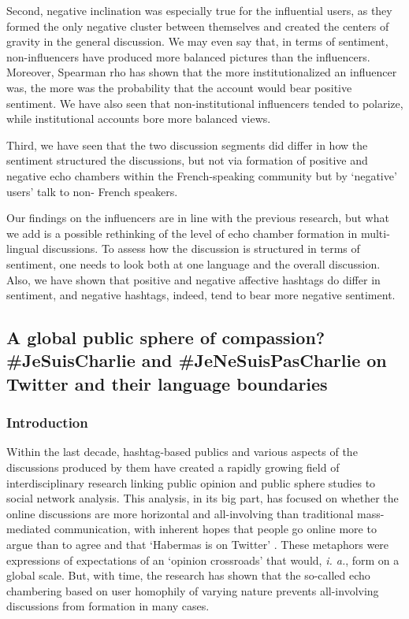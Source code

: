 Second, negative inclination was especially true for the influential users, as they formed the only negative cluster between themselves and created the centers of gravity in the general discussion. We may even say that, in terms of sentiment, non-influencers have produced more balanced pictures than the influencers. Moreover, Spearman rho has shown that the more institutionalized an influencer was, the more was the probability that the account would bear positive sentiment. We have also seen that non-institutional influencers tended to polarize, while institutional accounts bore more balanced views.

Third, we have seen that the two discussion segments did differ in how the sentiment structured the discussions, but not via formation of positive and negative echo chambers within the French-speaking community but by ‘negative’ users’ talk to non-
French speakers.

Our findings on the influencers are in line with the previous research, but what we add is a possible rethinking of the level of echo chamber formation in multi-lingual discussions. To assess how the discussion is structured in terms of sentiment, one needs to look both at one language and the overall discussion. Also, we have shown that positive and negative affective hashtags do differ in sentiment, and negative hashtags, indeed, tend to bear more negative sentiment.

\subsection{A global public sphere of compassion? \#JeSuisCharlie and \#JeNeSuisPasCharlie on Twitter and their language boundaries}\label{subsec:ch5/sec3/sub4}

\subsubsection{Introduction}

Within the last decade, hashtag-based publics and various aspects of the discussions produced by them have created a rapidly growing field of interdisciplinary research linking public opinion and public sphere studies to social network analysis. This analysis, in its big part, has focused on whether the online discussions are more horizontal and all-involving than traditional mass-mediated communication, with inherent hopes that people go online more to argue than to agree \cite{YardiBoyd2010} and that ‘Habermas is on Twitter’ \cite{BrunsHighfeld2016}. These metaphors were expressions of expectations of an ‘opinion crossroads’ that would, \textit{i. a.}, form on a global scale. But, with time, the research has shown that the so-called echo chambering \cite{Sunstein2002,ColleoniRozzaArvidsson} based on user homophily of varying nature prevents all-involving discussions from formation in many cases.

